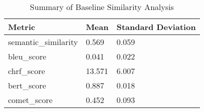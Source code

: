 \begin{table}
\caption{Summary of Baseline Similarity Analysis}
\label{tab:baseline_similarity_summary}
\begin{tabular}{lll}
\toprule
Metric & Mean & Standard Deviation \\
\midrule
semantic_similarity & 0.569 & 0.059 \\
bleu_score & 0.041 & 0.022 \\
chrf_score & 13.571 & 6.007 \\
bert_score & 0.887 & 0.018 \\
comet_score & 0.452 & 0.093 \\
\bottomrule
\end{tabular}
\end{table}
